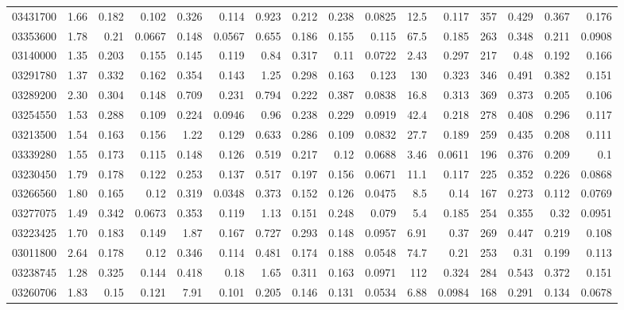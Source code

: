\begin{longtable}{l r rr rr rr rr rr rr rr}
03431700 & 1.66 & 0.182 & {0.102} & 0.326 & {0.114} & 0.923 & {0.212} & 0.238 & {0.0825} & 12.5 & {0.117} & 357 & {0.429} & 0.367 & {0.176}\\
03353600 & 1.78 & 0.21 & {0.0667} & 0.148 & {0.0567} & 0.655 & {0.186} & 0.155 & {0.115} & 67.5 & {0.185} & 263 & {0.348} & 0.211 & {0.0908}\\
03140000 & 1.35 & 0.203 & {0.155} & 0.145 & {0.119} & 0.84 & {0.317} & 0.11 & {0.0722} & 2.43 & {0.297} & 217 & {0.48} & 0.192 & {0.166}\\
03291780 & 1.37 & 0.332 & {0.162} & 0.354 & {0.143} & 1.25 & {0.298} & 0.163 & {0.123} & 130 & {0.323} & 346 & {0.491} & 0.382 & {0.151}\\
03289200 & 2.30 & 0.304 & {0.148} & 0.709 & {0.231} & 0.794 & {0.222} & 0.387 & {0.0838} & 16.8 & {0.313} & 369 & {0.373} & 0.205 & {0.106}\\
03254550 & 1.53 & 0.288 & {0.109} & 0.224 & {0.0946} & 0.96 & {0.238} & 0.229 & {0.0919} & 42.4 & {0.218} & 278 & {0.408} & 0.296 & {0.117}\\
03213500 & 1.54 & 0.163 & {0.156} & 1.22 & {0.129} & 0.633 & {0.286} & 0.109 & {0.0832} & 27.7 & {0.189} & 259 & {0.435} & 0.208 & {0.111}\\
03339280 & 1.55 & 0.173 & {0.115} & 0.148 & {0.126} & 0.519 & {0.217} & 0.12 & {0.0688} & 3.46 & {0.0611} & 196 & {0.376} & 0.209 & {0.1}\\
03230450 & 1.79 & 0.178 & {0.122} & 0.253 & {0.137} & 0.517 & {0.197} & 0.156 & {0.0671} & 11.1 & {0.117} & 225 & {0.352} & 0.226 & {0.0868}\\
03266560 & 1.80 & 0.165 & {0.12} & 0.319 & {0.0348} & 0.373 & {0.152} & 0.126 & {0.0475} & 8.5 & {0.14} & 167 & {0.273} & 0.112 & {0.0769}\\
03277075 & 1.49 & 0.342 & {0.0673} & 0.353 & {0.119} & 1.13 & {0.151} & 0.248 & {0.079} & 5.4 & {0.185} & 254 & {0.355} & 0.32 & {0.0951}\\
03223425 & 1.70 & 0.183 & {0.149} & 1.87 & {0.167} & 0.727 & {0.293} & 0.148 & {0.0957} & 6.91 & {0.37} & 269 & {0.447} & 0.219 & {0.108}\\
03011800 & 2.64 & 0.178 & {0.12} & 0.346 & {0.114} & 0.481 & {0.174} & 0.188 & {0.0548} & 74.7 & {0.21} & 253 & {0.31} & 0.199 & {0.113}\\
03238745 & 1.28 & 0.325 & {0.144} & 0.418 & {0.18} & 1.65 & {0.311} & 0.163 & {0.0971} & 112 & {0.324} & 284 & {0.543} & 0.372 & {0.151}\\
03260706 & 1.83 & 0.15 & {0.121} & 7.91 & {0.101} & 0.205 & {0.146} & 0.131 & {0.0534} & 6.88 & {0.0984} & 168 & {0.291} & 0.134 & {0.0678}\\

\end{longtable}
